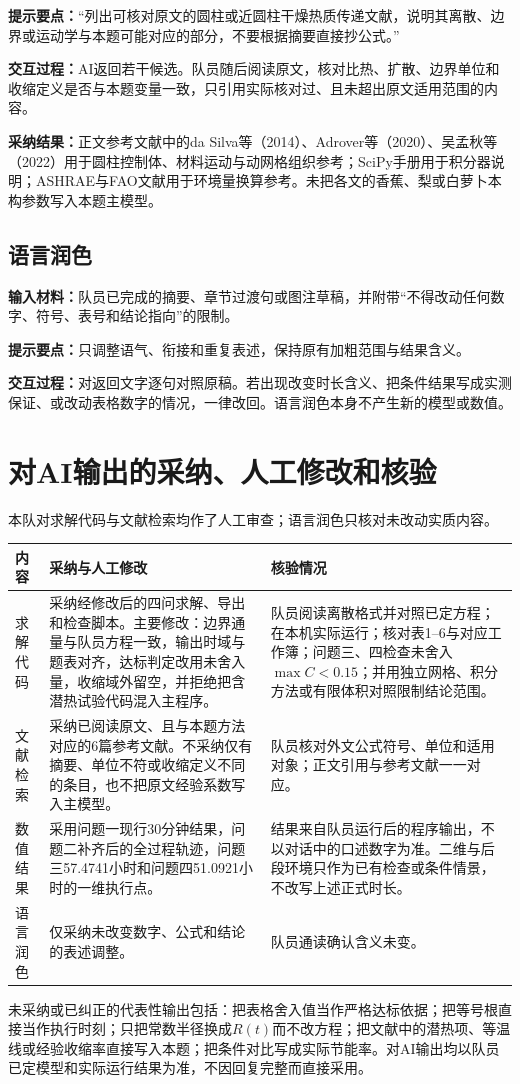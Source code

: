 \documentclass[UTF8,a4paper,zihao=5,fontset=windows]{ctexart}
\begin{document}
\textbf{提示要点：}“列出可核对原文的圆柱或近圆柱干燥热质传递文献，说明其离散、边界或运动学与本题可能对应的部分，不要根据摘要直接抄公式。”

\textbf{交互过程：}AI返回若干候选。队员随后阅读原文，核对比热、扩散、边界单位和收缩定义是否与本题变量一致，只引用实际核对过、且未超出原文适用范围的内容。

\textbf{采纳结果：}正文参考文献中的da Silva等（2014）、Adrover等（2020）、吴孟秋等（2022）用于圆柱控制体、材料运动与动网格组织参考；SciPy手册用于积分器说明；ASHRAE与FAO文献用于环境量换算参考。未把各文的香蕉、梨或白萝卜本构参数写入本题主模型。

\subsection{语言润色}
\textbf{输入材料：}队员已完成的摘要、章节过渡句或图注草稿，并附带“不得改动任何数字、符号、表号和结论指向”的限制。

\textbf{提示要点：}只调整语气、衔接和重复表述，保持原有加粗范围与结果含义。

\textbf{交互过程：}对返回文字逐句对照原稿。若出现改变时长含义、把条件结果写成实测保证、或改动表格数字的情况，一律改回。语言润色本身不产生新的模型或数值。

\section{对AI输出的采纳、人工修改和核验}
本队对求解代码与文献检索均作了人工审查；语言润色只核对未改动实质内容。

\noindent
\begin{tabular}{@{}L{.16\linewidth}L{.42\linewidth}L{.35\linewidth}@{}}
\toprule
内容 & 采纳与人工修改 & 核验情况 \\\midrule
求解代码 &
采纳经修改后的四问求解、导出和检查脚本。主要修改：边界通量与队员方程一致，输出时域与题表对齐，达标判定改用未舍入量，收缩域外留空，并拒绝把含潜热试验代码混入主程序。&
队员阅读离散格式并对照已定方程；在本机实际运行；核对表1--6与对应工作簿；问题三、四检查未舍入$\max C<0.15$；并用独立网格、积分方法或有限体积对照限制结论范围。\\
文献检索 &
采纳已阅读原文、且与本题方法对应的6篇参考文献。不采纳仅有摘要、单位不符或收缩定义不同的条目，也不把原文经验系数写入主模型。&
队员核对外文公式符号、单位和适用对象；正文引用与参考文献一一对应。\\
数值结果 &
采用问题一现行30分钟结果，问题二补齐后的全过程轨迹，问题三57.4741小时和问题四51.0921小时的一维执行点。&
结果来自队员运行后的程序输出，不以对话中的口述数字为准。二维与后段环境只作为已有检查或条件情景，不改写上述正式时长。\\
语言润色 &
仅采纳未改变数字、公式和结论的表述调整。&
队员通读确认含义未变。\\
\bottomrule
\end{tabular}

\vspace{0.6em}
未采纳或已纠正的代表性输出包括：把表格舍入值当作严格达标依据；把等号根直接当作执行时刻；只把常数半径换成$R(t)$而不改方程；把文献中的潜热项、等温线或经验收缩率直接写入本题；把条件对比写成实际节能率。对AI输出均以队员已定模型和实际运行结果为准，不因回复完整而直接采用。
\end{document}
